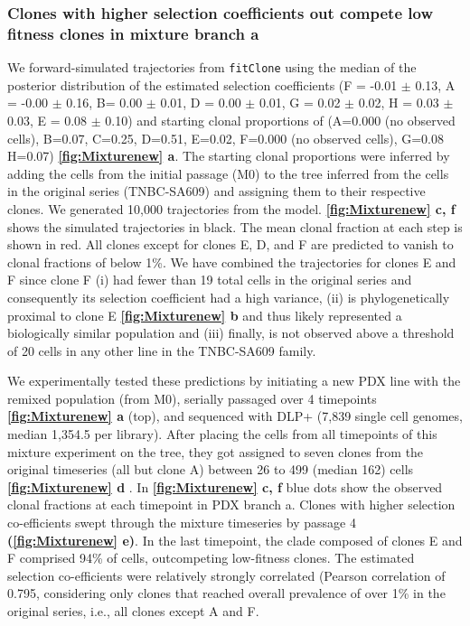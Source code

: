 \subsubsection{Clones with higher selection coefficients out compete low fitness clones in mixture branch a}
We forward-simulated trajectories from \texttt{fitClone} using the median of the posterior distribution of the estimated selection coefficients (F = -0.01  $\pm$ 0.13, A = -0.00 $\pm$ 0.16, B= 0.00 $\pm$  0.01, D = 0.00  $\pm$  0.01, G = 0.02  $\pm$  0.02, H = 0.03  $\pm$  0.03, E = 0.08  $\pm$ 0.10) and starting clonal proportions of (A=0.000 (no observed cells), B=0.07, C=0.25, D=0.51, E=0.02, F=0.000 (no observed cells), G=0.08 H=0.07) \textbf{\autoref{fig:Mixturenew} a}. The starting clonal proportions were inferred by adding the cells from the initial passage (M0) to the tree inferred from the cells in the original series (TNBC-SA609) and assigning them to their respective clones. We generated 10,000 trajectories from the model. \textbf{\autoref{fig:Mixturenew} c, f} shows the simulated trajectories in black.
The mean clonal fraction at each step is shown in red. All clones except for clones E, D, and F are predicted to vanish to clonal fractions of below 1\%. We have combined the trajectories for clones E and F since clone F (i) had fewer than 19 total cells in the original series and consequently its selection coefficient had a high variance, (ii) is phylogenetically proximal to clone E \textbf{\autoref{fig:Mixturenew} b} and thus likely represented a biologically similar population and (iii) finally, is not observed above a threshold of 20 cells in any other line in the TNBC-SA609 family.

We experimentally tested these predictions by initiating a new PDX line with the remixed population (from M0), serially passaged over 4 timepoints \textbf{\autoref{fig:Mixturenew} a} (top), and sequenced with DLP+ (7,839 single cell genomes, median 1,354.5 per library). After placing the cells from all timepoints of this mixture experiment on the tree, they got assigned to seven clones from the original timeseries (all but clone A) between 26 to 499 (median 162) cells \textbf{\autoref{fig:Mixturenew} d} . In \textbf{\autoref{fig:Mixturenew} c, f} blue dots show the observed clonal fractions at each timepoint in PDX branch a. Clones with higher selection co-efficients swept through the mixture timeseries by passage 4 \textbf{(\autoref{fig:Mixturenew} e)}. In the last timepoint, the clade composed of clones E and F comprised 94\% of cells, outcompeting low-fitness clones. The estimated selection co-efficients were relatively strongly correlated (Pearson correlation of 0.795, considering only clones that reached overall prevalence of over 1\% in the original series, i.e., all clones except A and F.

